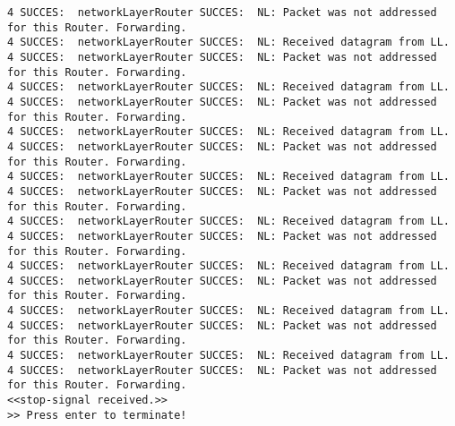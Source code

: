 \begin{lstlisting}[breaklines=true]
4 SUCCES:  networkLayerRouter SUCCES:  NL: Packet was not addressed for this Router. Forwarding.
4 SUCCES:  networkLayerRouter SUCCES:  NL: Received datagram from LL.
4 SUCCES:  networkLayerRouter SUCCES:  NL: Packet was not addressed for this Router. Forwarding.
4 SUCCES:  networkLayerRouter SUCCES:  NL: Received datagram from LL.
4 SUCCES:  networkLayerRouter SUCCES:  NL: Packet was not addressed for this Router. Forwarding.
4 SUCCES:  networkLayerRouter SUCCES:  NL: Received datagram from LL.
4 SUCCES:  networkLayerRouter SUCCES:  NL: Packet was not addressed for this Router. Forwarding.
4 SUCCES:  networkLayerRouter SUCCES:  NL: Received datagram from LL.
4 SUCCES:  networkLayerRouter SUCCES:  NL: Packet was not addressed for this Router. Forwarding.
4 SUCCES:  networkLayerRouter SUCCES:  NL: Received datagram from LL.
4 SUCCES:  networkLayerRouter SUCCES:  NL: Packet was not addressed for this Router. Forwarding.
4 SUCCES:  networkLayerRouter SUCCES:  NL: Received datagram from LL.
4 SUCCES:  networkLayerRouter SUCCES:  NL: Packet was not addressed for this Router. Forwarding.
4 SUCCES:  networkLayerRouter SUCCES:  NL: Received datagram from LL.
4 SUCCES:  networkLayerRouter SUCCES:  NL: Packet was not addressed for this Router. Forwarding.
4 SUCCES:  networkLayerRouter SUCCES:  NL: Received datagram from LL.
4 SUCCES:  networkLayerRouter SUCCES:  NL: Packet was not addressed for this Router. Forwarding.
<<stop-signal received.>>
>> Press enter to terminate!
\end{lstlisting}




